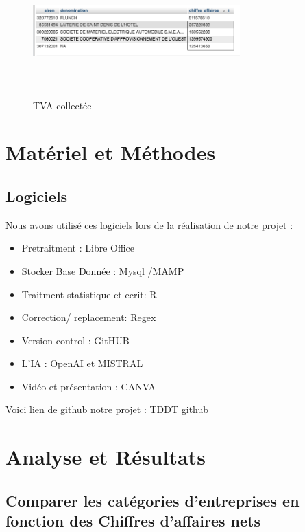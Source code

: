 \documentclass[mstat,12pt]{unswthesis}
\begin{document}
\begin{figure}
\centering
\includegraphics[width=8cm,height=5cm]{image_sql/tva_collecte.png}
\caption{TVA collectée}
\end{figure}

\newpage

\chapter{Matériel et Méthodes}\label{matuxe9riel-et-muxe9thodes}

\section{Logiciels}\label{logiciels}

Nous avons utilisé ces logiciels lors de la réalisation de notre projet
:

\begin{itemize}
\tightlist
\item
  Pretraitment : Libre Office
\item
  Stocker Base Donnée : Mysql /MAMP
\item
  Traitment statistique et ecrit: R
\item
  Correction/ replacement: Regex
\item
  Version control : GitHUB
\item
  L'IA : OpenAI et MISTRAL
\item
  Vidéo et présentation : CANVA
\end{itemize}

\bigskip

Voici lien de github notre projet :
\href{https://github.com/serdarvarl/Project_DataBase_FR.git}{TDDT github}

\chapter{Analyse et Résultats}\label{analyse-et-ruxe9sultats}

\section{\texorpdfstring{\textbf{Comparer les catégories d'entreprises
en fonction des Chiffres d'affaires
nets}}{Comparer les catégories d'entreprises en fonction des Chiffres d'affaires nets}}\label{comparer-les-catuxe9gories-dentreprises-en-fonction-des-chiffres-daffaires-nets}
\end{document}
